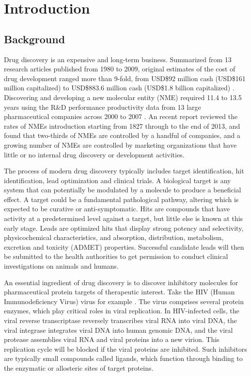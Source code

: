 \chapter{Introduction}

\section{Background}

Drug discovery is an expensive and long-term business. Summarized from 13 research articles published from 1980 to 2009, original estimates of the cost of drug development ranged more than 9-fold, from USD\$92 million cash (USD\$161 million capitalized) to USD\$883.6 million cash (USD\$1.8 billion capitalized) \citep{1431}. Discovering and developing a new molecular entity (NME) required 11.4 to 13.5 years using the R\&D performance productivity data from 13 large pharmaceutical companies across 2000 to 2007 \citep{716}. An recent report \citep{1427} reviewed the rates of NMEs introduction starting from 1827 through to the end of 2013, and found that two-thirds of NMEs are controlled by a handful of companies, and a growing number of NMEs are controlled by marketing organizations that have little or no internal drug discovery or development activities.

The process of modern drug discovery typically includes target identification, hit identification, lead optimization and clinical trials. A biological target is any system that can potentially be modulated by a molecule to produce a beneficial effect. A target could be a fundamental pathological pathway, altering which is expected to be curative or anti-symptomatic. Hits are compounds that have activity at a predetermined level against a target, but little else is known at this early stage. Leads are optimized hits that display strong potency and selectivity, physicochemical characteristics, and absorption, distribution, metabolism, excretion and toxicity (ADMET) properties. Successful candidate leads will then be submitted to the health authorities to get permission to conduct clinical investigations on animals and humans.

An essential ingredient of drug discovery is to discover inhibitory molecules for pharmaceutical protein targets of therapeutic interest. Take the HIV (Human Immunodeficiency Virus) virus for example \citep{296}. The virus comprises several protein enzymes, which play critical roles in viral replication. In HIV-infected cells, the viral reverse transcriptase reversely transcribes viral RNA into viral DNA, the viral integrase integrates viral DNA into human genomic DNA, and the viral protease assemblies viral RNA and viral proteins into a new virion. This replication cycle will be blocked if the viral proteins are inhibited. Such inhibitors are typically small compounds called ligands, which function through binding to the enzymatic or allosteric sites of target proteins.

